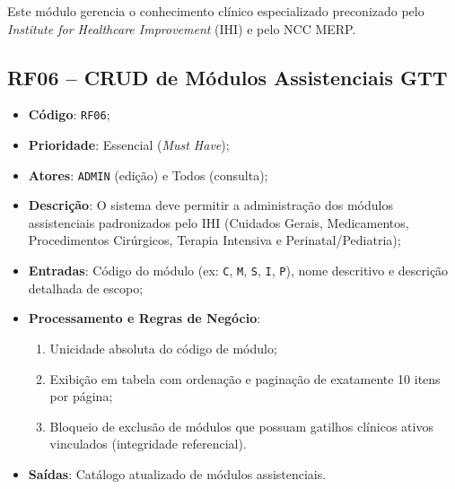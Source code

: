 Este módulo gerencia o conhecimento clínico especializado preconizado pelo \textit{Institute for Healthcare Improvement} (IHI) e pelo NCC MERP.

\subsection{RF06 -- CRUD de Módulos Assistenciais GTT}
\begin{itemize}
    \item \textbf{Código}: \texttt{RF06};
    \item \textbf{Prioridade}: Essencial (\textit{Must Have});
    \item \textbf{Atores}: \texttt{ADMIN} (edição) e Todos (consulta);
    \item \textbf{Descrição}: O sistema deve permitir a administração dos módulos assistenciais padronizados pelo IHI (Cuidados Gerais, Medicamentos, Procedimentos Cirúrgicos, Terapia Intensiva e Perinatal/Pediatria);
    \item \textbf{Entradas}: Código do módulo (ex: \texttt{C}, \texttt{M}, \texttt{S}, \texttt{I}, \texttt{P}), nome descritivo e descrição detalhada de escopo;
    \item \textbf{Processamento e Regras de Negócio}:
    \begin{enumerate}
        \item Unicidade absoluta do código de módulo;
        \item Exibição em tabela com ordenação e paginação de exatamente 10 itens por página;
        \item Bloqueio de exclusão de módulos que possuam gatilhos clínicos ativos vinculados (integridade referencial).
    \end{enumerate}
    \item \textbf{Saídas}: Catálogo atualizado de módulos assistenciais.
\end{itemize}

